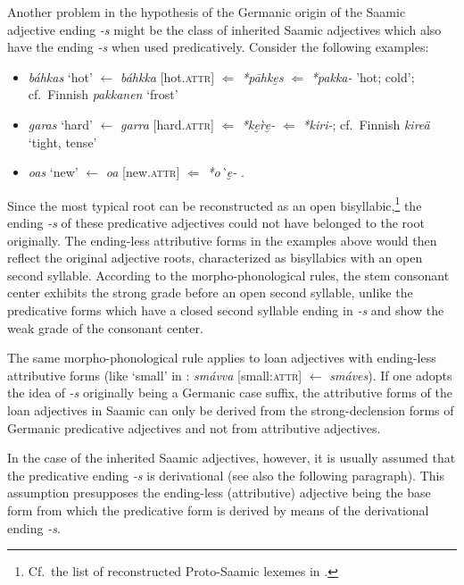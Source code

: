 {Another problem in the hypothesis of the Germanic origin of the Saamic adjective ending \textit{-s} might be the class of inherited Saamic adjectives which also have the ending \textit{-s} when used predicatively. Consider the following examples:
\begin{itemize}
\item {} \textit{báhkas} ‘hot’ $\leftarrow$ \textit{báhkka} [hot.\textsc{attr}] $\Leftarrow$  \textit{*pāhke̮s} $\Leftarrow$  \textit{*pakka-} 'hot; cold’; cf.~Finnish \textit{pakkanen} ‘frost’ \cite[230]{sammallahti1998b}
\item {} \textit{garas} ‘hard’ $\leftarrow$ \textit{garra} [hard.\textsc{attr}] $\Leftarrow$  \textit{*ke̮\`re̮-} $\Leftarrow$  \textit{*kiri-}; cf.~Finnish \textit{kireä} ‘tight, tense’ \cite[242]{sammallahti1998b}
\item {} \textit{o{\dj}as} ‘new’ $\leftarrow$ \textit{o{\dj}{\dj}a} [new.\textsc{attr}] $\Leftarrow$  \textit{*o\`{\dh}e̮-} \cite[258]{sammallahti1998b}.
\end{itemize}
Since the most typical  root can be reconstructed as an open bisyllabic,\footnote{Cf.~the list of reconstructed Proto\hyp{}Saamic lexemes in \cite{lehtiranta1989}.} the ending \textit{-s} of these predicative adjectives could not have belonged to the root originally. The ending-less attributive forms in the examples above would then reflect the original adjective roots, characterized as bisyllabics with an open second syllable. According to the  morpho-phonological rules, the stem consonant center exhibits the strong grade before an open second syllable, unlike the predicative forms which have a closed second syllable ending in \textit{-s} and show the weak grade of the consonant center.

The same morpho-phonological rule applies to loan adjectives with ending-less attributive forms (like ‘small’ in : \textit{smávva} [small:\textsc{attr}] $\leftarrow$ \textit{smáves}). If one adopts the idea of \textit{-s} originally being a Germanic case suffix, the attributive forms of the loan adjectives in Saamic can only be derived from the strong-declension forms of Germanic predicative adjectives and not from attributive adjectives.

In the case of the inherited Saamic adjectives, however, it is usually assumed that the predicative ending \textit{-s} is derivational (see also the following paragraph). This assumption presupposes the ending-less (attributive) adjective being the base form from which the predicative form is derived by means of the derivational ending \textit{-s}. %

}
